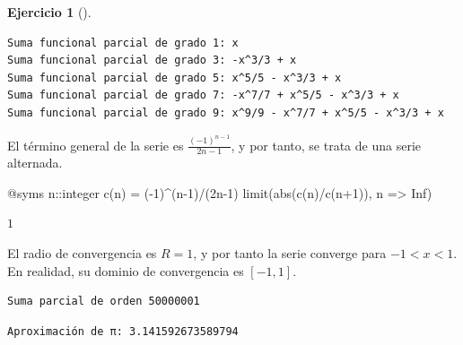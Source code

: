 \documentclass[
  a4paper,
]{scrreport}
\newenvironment{Shaded}{\begin{snugshade}}{\end{snugshade}}
\newcommand{\ConstantTok}[1]{\textcolor[rgb]{0.56,0.35,0.01}{#1}}
\newcommand{\ControlFlowTok}[1]{\textcolor[rgb]{0.00,0.23,0.31}{#1}}
\newcommand{\DataTypeTok}[1]{\textcolor[rgb]{0.68,0.00,0.00}{#1}}
\newcommand{\FloatTok}[1]{\textcolor[rgb]{0.68,0.00,0.00}{#1}}
\newcommand{\FunctionTok}[1]{\textcolor[rgb]{0.28,0.35,0.67}{#1}}
\newcommand{\NormalTok}[1]{\textcolor[rgb]{0.00,0.23,0.31}{#1}}
\newcommand{\OperatorTok}[1]{\textcolor[rgb]{0.37,0.37,0.37}{#1}}
\newcommand{\PreprocessorTok}[1]{\textcolor[rgb]{0.68,0.00,0.00}{#1}}
\newcommand{\SpecialCharTok}[1]{\textcolor[rgb]{0.37,0.37,0.37}{#1}}
\newcommand{\StringTok}[1]{\textcolor[rgb]{0.13,0.47,0.30}{#1}}
\theoremstyle{definition}
\newtheorem{exercise}{Ejercicio}[chapter]
\theoremstyle{remark}
\begin{document}
\begin{exercise}[]
\begin{tcolorbox}
\begin{verbatim}
Suma funcional parcial de grado 1: x
Suma funcional parcial de grado 3: -x^3/3 + x
Suma funcional parcial de grado 5: x^5/5 - x^3/3 + x
Suma funcional parcial de grado 7: -x^7/7 + x^5/5 - x^3/3 + x
Suma funcional parcial de grado 9: x^9/9 - x^7/7 + x^5/5 - x^3/3 + x
\end{verbatim}

El término general de la serie es \(\frac{(-1)^{n-1}}{2n-1}\), y por
tanto, se trata de una serie alternada.

\begin{Shaded}
\begin{Highlighting}[]
\PreprocessorTok{@syms}\NormalTok{ n}\OperatorTok{::}\DataTypeTok{integer}
\FunctionTok{c}\NormalTok{(n) }\OperatorTok{=}\NormalTok{ (}\OperatorTok{{-}}\FloatTok{1}\NormalTok{)}\OperatorTok{\^{}}\NormalTok{(n}\OperatorTok{{-}}\FloatTok{1}\NormalTok{)}\OperatorTok{/}\NormalTok{(}\FloatTok{2}\NormalTok{n}\OperatorTok{{-}}\FloatTok{1}\NormalTok{)}
\FunctionTok{limit}\NormalTok{(}\FunctionTok{abs}\NormalTok{(}\FunctionTok{c}\NormalTok{(n)}\OperatorTok{/}\FunctionTok{c}\NormalTok{(n}\OperatorTok{+}\FloatTok{1}\NormalTok{)), n }\OperatorTok{=\textgreater{}} \ConstantTok{Inf}\NormalTok{)}
\end{Highlighting}
\end{Shaded}

$1$

El radio de convergencia es \(R=1\), y por tanto la serie converge para
\(-1<x<1\). En realidad, su dominio de convergencia es \([-1,1]\).

\begin{Shaded}
\end{Shaded}

\begin{verbatim}
Suma parcial de orden 50000001
\end{verbatim}

\begin{verbatim}
Aproximación de π: 3.141592673589794
\end{verbatim}

\end{tcolorbox}

\end{exercise}
\end{document}
